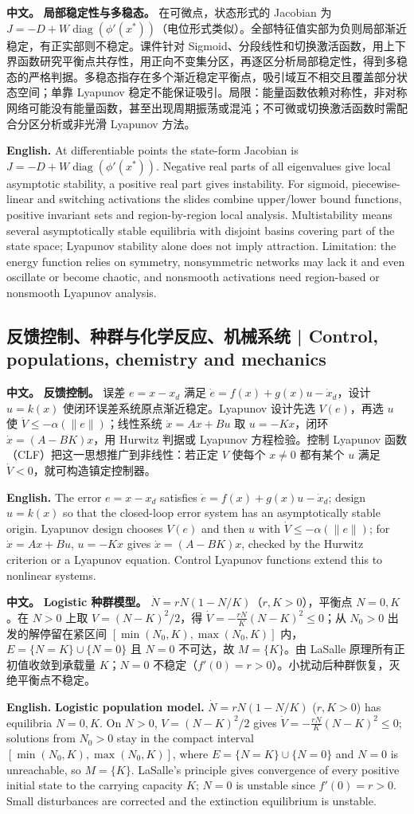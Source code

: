\documentclass[UTF8,11pt,a4paper]{ctexart}
\newcommand{\APS}[2]{\par\noindent\textbf{中文。} #1\par\noindent\textbf{English.} #2\par}
\newcommand{\norm}[1]{\lVert #1\rVert}\newcommand{\abs}[1]{\lvert #1\rvert}
\begin{document}
\APS{\textbf{局部稳定性与多稳态。} 在可微点，状态形式的 Jacobian 为 $J=-D+W\operatorname{diag}(\phi'(x^*))$（电位形式类似）。全部特征值实部为负则局部渐近稳定，有正实部则不稳定。课件针对 Sigmoid、分段线性和切换激活函数，用上下界函数研究平衡点共存性，用正向不变集分区，再逐区分析局部稳定性，得到多稳态的严格判据。多稳态指存在多个渐近稳定平衡点，吸引域互不相交且覆盖部分状态空间；单靠 Lyapunov 稳定不能保证吸引。局限：能量函数依赖对称性，非对称网络可能没有能量函数，甚至出现周期振荡或混沌；不可微或切换激活函数时需配合分区分析或非光滑 Lyapunov 方法。}{At differentiable points the state-form Jacobian is $J=-D+W\operatorname{diag}(\phi'(x^*))$. Negative real parts of all eigenvalues give local asymptotic stability, a positive real part gives instability. For sigmoid, piecewise-linear and switching activations the slides combine upper/lower bound functions, positive invariant sets and region-by-region local analysis. Multistability means several asymptotically stable equilibria with disjoint basins covering part of the state space; Lyapunov stability alone does not imply attraction. Limitation: the energy function relies on symmetry, nonsymmetric networks may lack it and even oscillate or become chaotic, and nonsmooth activations need region-based or nonsmooth Lyapunov analysis.}

\subsection{反馈控制、种群与化学反应、机械系统 | Control, populations, chemistry and mechanics}
\APS{\textbf{反馈控制。} 误差 $e=x-x_d$ 满足 $\dot e=f(x)+g(x)u-\dot x_d$，设计 $u=k(x)$ 使闭环误差系统原点渐近稳定。Lyapunov 设计先选 $V(e)$，再选 $u$ 使 $\dot V\le-\alpha(\norm{e})$；线性系统 $\dot x=Ax+Bu$ 取 $u=-Kx$，闭环 $\dot x=(A-BK)x$，用 Hurwitz 判据或 Lyapunov 方程检验。控制 Lyapunov 函数（CLF）把这一思想推广到非线性：若正定 $V$ 使每个 $x\ne0$ 都有某个 $u$ 满足 $\dot V<0$，就可构造镇定控制器。}{The error $e=x-x_d$ satisfies $\dot e=f(x)+g(x)u-\dot x_d$; design $u=k(x)$ so that the closed-loop error system has an asymptotically stable origin. Lyapunov design chooses $V(e)$ and then $u$ with $\dot V\le-\alpha(\norm{e})$; for $\dot x=Ax+Bu$, $u=-Kx$ gives $\dot x=(A-BK)x$, checked by the Hurwitz criterion or a Lyapunov equation. Control Lyapunov functions extend this to nonlinear systems.}

\APS{\textbf{Logistic 种群模型。} $\dot N=rN(1-N/K)$（$r,K>0$），平衡点 $N=0,K$。在 $N>0$ 上取 $V=(N-K)^2/2$，得 $\dot V=-\frac{rN}{K}(N-K)^2\le0$；从 $N_0>0$ 出发的解停留在紧区间 $[\min(N_0,K),\max(N_0,K)]$ 内，$E=\{N=K\}\cup\{N=0\}$ 且 $N=0$ 不可达，故 $M=\{K\}$。由 LaSalle 原理所有正初值收敛到承载量 $K$；$N=0$ 不稳定（$f'(0)=r>0$）。小扰动后种群恢复，灭绝平衡点不稳定。}{\textbf{Logistic population model.} $\dot N=rN(1-N/K)$ ($r,K>0$) has equilibria $N=0,K$. On $N>0$, $V=(N-K)^2/2$ gives $\dot V=-\frac{rN}{K}(N-K)^2\le0$; solutions from $N_0>0$ stay in the compact interval $[\min(N_0,K),\max(N_0,K)]$, where $E=\{N=K\}\cup\{N=0\}$ and $N=0$ is unreachable, so $M=\{K\}$. LaSalle's principle gives convergence of every positive initial state to the carrying capacity $K$; $N=0$ is unstable since $f'(0)=r>0$. Small disturbances are corrected and the extinction equilibrium is unstable.}
\end{document}
